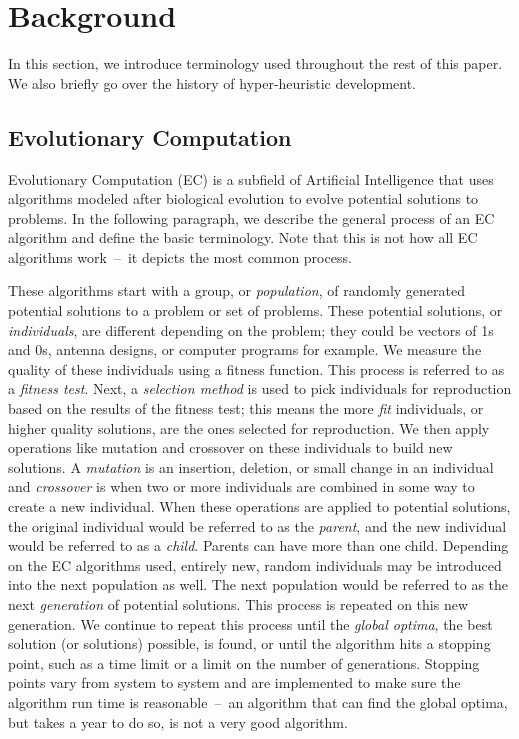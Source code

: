 \documentclass{sig-alternate}
\begin{document}
\section{Background}
\label{sec:background}
In this section, we introduce terminology used throughout the rest of this paper. We also briefly go over the history of hyper-heuristic development.

\subsection{Evolutionary Computation}
\label{sec:evocomp}
Evolutionary Computation (EC) is a subfield of Artificial Intelligence that uses algorithms modeled after biological evolution to evolve potential solutions to problems. In the following paragraph, we describe the general process of an EC algorithm and define the basic terminology. Note that this is not how all EC algorithms work~--~it depicts the most common process.

These algorithms start with a group, or \textit{population}, of randomly generated potential solutions to a problem or set of problems. These potential solutions, or \textit{individuals}, are different depending on the problem; they could be vectors of 1s and 0s, antenna designs, or computer programs for example. We measure the quality of these individuals using a fitness function. This process is referred to as a \textit{fitness test}. Next, a \textit{selection method} is used to pick individuals for reproduction based on the results of the fitness test; this means the more \textit{fit} individuals, or higher quality solutions, are the ones selected for reproduction. We then apply operations like mutation and crossover on these individuals to build new solutions. A \textit{mutation} is an insertion, deletion, or small change in an individual and \textit{crossover} is when two or more individuals are combined in some way to create a new individual. When these operations are applied to potential solutions, the original individual would be referred to as the \textit{parent}, and the new individual would be referred to as a \textit{child}. Parents can have more than one child. Depending on the EC algorithms used, entirely new, random individuals may be introduced into the next population as well. The next population would be referred to as the next \textit{generation} of potential solutions. This process is repeated on this new generation. We continue to repeat this process until the \textit{global optima}, the best solution (or solutions) possible, is found, or until the algorithm hits a stopping point, such as a time limit or a limit on the number of generations. Stopping points vary from system to system and are implemented to make sure the algorithm run time is reasonable~--~an algorithm that can find the global optima, but takes a year to do so, is not a very good algorithm.
\end{document}
